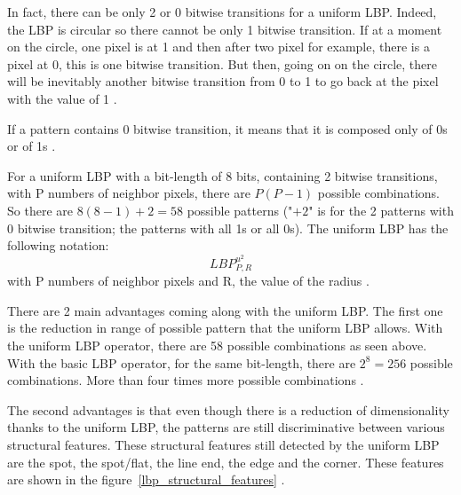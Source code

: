 \noindent In fact, there can be only 2 or 0 bitwise transitions for a uniform LBP. Indeed, the LBP is circular so there cannot be only 1 bitwise transition. If at a moment on the circle, one pixel is at 1 and then after two pixel for example, there is a pixel at 0, this is one bitwise transition. But then, going on on the circle, there will be inevitably another bitwise transition from 0 to 1 to go back at the pixel with the value of 1 \cite{GAN08}.
\newline

\noindent If a pattern contains 0 bitwise transition, it means that it is composed only of 0s or of 1s \cite{GAN08}.
\newline

\noindent For a uniform LBP with a bit-length of 8 bits, containing 2 bitwise transitions, with P numbers of neighbor pixels, there are $ P(P - 1) $ possible combinations. So there are $ 8(8 - 1) + 2 =58 $ possible patterns ("$ + 2 $" is for the 2 patterns with 0 bitwise transition; the patterns with all 1s or all 0s). The uniform LBP has the following notation: \[ LBP_{P,R}^{u^2} \] with P numbers of neighbor pixels and R, the value of the radius \cite{GAN08}.
\newline

\noindent There are 2 main advantages coming along with the uniform LBP. The first one is the reduction in range of possible pattern that the uniform LBP allows. With the uniform LBP operator, there are 58 possible combinations as seen above. With the basic LBP operator, for the same bit-length, there are $ 2^8 = 256 $ possible combinations. More than four times more possible combinations \cite{GAN08}.
\newline

\noindent The second advantages is that even though there is a reduction of dimensionality thanks to the uniform LBP, the patterns are still discriminative between various structural features. These structural features still detected by the uniform LBP are the spot, the spot/flat, the line end, the edge and the corner. These features are shown in the figure~\ref{lbp_structural_features}  \cite{GAN08}.
\newline


